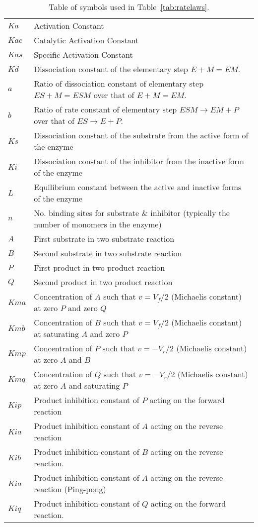 \documentclass[10pt]{cek-article}
\begin{document}
\begin{table}[ht]
\begin{tabular}{lp{5.5in}}
$Ka    $&      Activation Constant \\
$Kac   $&     Catalytic Activation Constant \\
$Kas   $&     Specific Activation Constant \\
$Kd    $&     Dissociation constant of the elementary step $E + M = EM$. \\
$a     $&        Ratio of dissociation constant of elementary step $ES + M = ESM$ over that of $E + M = EM$. \\
$b     $&        Ratio of rate constant of elementary step $ESM \rightarrow EM + P$ over that of $ES \rightarrow E + P$. \\
$Ks    $&      Dissociation constant of the substrate from the active form of the enzyme \\
$Ki    $&       Dissociation constant of the inhibitor from the inactive form of the enzyme \\
$L     $&        Equilibrium constant between the active and inactive forms of the enzyme \\
$n     $&       No. binding sites for substrate \& inhibitor (typically the number of monomers in the enzyme) \\
$A     $&      First substrate in two substrate reaction \\
$B      $&      Second substrate in two substrate reaction \\
$P      $&      First product in two product reaction \\
$Q      $&     Second product in two product reaction \\
$Kma    $&  Concentration of $A$ such that $v = V_f/2$  (Michaelis constant) at zero $P$ and zero $Q$ \\
$Kmb   $&   Concentration of $B$ such that $v = V_f/2$  (Michaelis constant) at saturating $A$ and zero $P$ \\
$Kmp   $&   Concentration of $P$ such that $v = -V_r/2$  (Michaelis constant) at zero $A$ and $B$ \\
$Kmq   $&   Concentration of $Q$ such that $v = -V_r/2$  (Michaelis constant) at zero $A$ and saturating $P$ \\
$Kip   $&    Product inhibition constant of $P$ acting on the forward reaction \\
$Kia   $&     Product inhibition constant of $A$ acting on the reverse reaction \\
$Kib    $&    Product inhibition constant of $B$ acting on the reverse reaction. \\
$Kia    $&      Product inhibition constant of $A$ acting on the reverse reaction (Ping-pong) \\
$Kiq    $&     Product inhibition constant of $Q$ acting on the forward reaction. \\
\end{tabular}
\caption{Table of symbols used in Table~\ref{tab:ratelaws}.}
\end{table}
\end{document}
